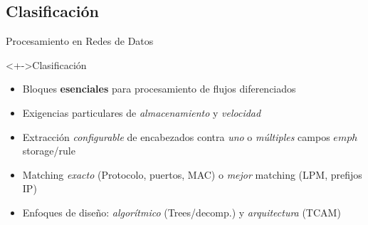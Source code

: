 \documentclass[xcolor=dvipsnames]{beamer}
\begin{document}
\subsection{Clasificación}
\begin{frame}{Procesamiento en Redes de Datos}
  \begin{block}<+->{Clasificación}
    \begin{itemize}
      \item Bloques {\bf esenciales} para procesamiento de flujos diferenciados
      \item Exigencias particulares de \emph{almacenamiento} y \emph{velocidad}
      \item Extracción \emph{configurable} de encabezados contra \emph{uno} o \emph{múltiples} campos $emph$ storage/rule
      \item Matching \emph{exacto} (Protocolo, puertos, MAC) o \emph{mejor} matching (LPM, prefijos IP)
      \item Enfoques de diseño: \emph{algorítmico} (Trees/decomp.) y \emph{arquitectura} (TCAM)
    \end{itemize}
  \end{block}
  

\end{frame}
\end{document}
